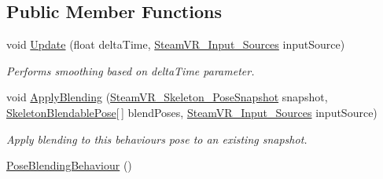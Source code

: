 \subsection*{Public Member Functions}
\begin{DoxyCompactItemize}
\item 
void \mbox{\hyperlink{class_valve_1_1_v_r_1_1_steam_v_r___skeleton___poser_1_1_pose_blending_behaviour_a2a3ef1ddac4665cde9a9ce569ccd5f6a}{Update}} (float delta\+Time, \mbox{\hyperlink{namespace_valve_1_1_v_r_a82e5bf501cc3aa155444ee3f0662853f}{Steam\+V\+R\+\_\+\+Input\+\_\+\+Sources}} input\+Source)
\begin{DoxyCompactList}\small\item\em Performs smoothing based on delta\+Time parameter. \end{DoxyCompactList}\item 
void \mbox{\hyperlink{class_valve_1_1_v_r_1_1_steam_v_r___skeleton___poser_1_1_pose_blending_behaviour_a74a13bd0fd09230cfecef40ed81e0c05}{Apply\+Blending}} (\mbox{\hyperlink{class_valve_1_1_v_r_1_1_steam_v_r___skeleton___pose_snapshot}{Steam\+V\+R\+\_\+\+Skeleton\+\_\+\+Pose\+Snapshot}} snapshot, \mbox{\hyperlink{class_valve_1_1_v_r_1_1_steam_v_r___skeleton___poser_1_1_skeleton_blendable_pose}{Skeleton\+Blendable\+Pose}}\mbox{[}$\,$\mbox{]} blend\+Poses, \mbox{\hyperlink{namespace_valve_1_1_v_r_a82e5bf501cc3aa155444ee3f0662853f}{Steam\+V\+R\+\_\+\+Input\+\_\+\+Sources}} input\+Source)
\begin{DoxyCompactList}\small\item\em Apply blending to this behaviour\textquotesingle{}s pose to an existing snapshot. \end{DoxyCompactList}\item 
\mbox{\hyperlink{class_valve_1_1_v_r_1_1_steam_v_r___skeleton___poser_1_1_pose_blending_behaviour_a216e48a9e354b76b6d822eff844a6b91}{Pose\+Blending\+Behaviour}} ()
\end{DoxyCompactItemize}
